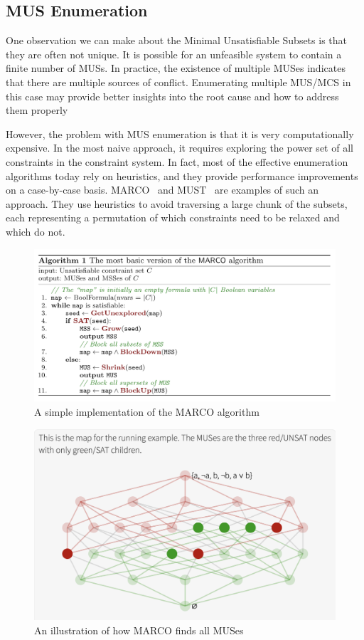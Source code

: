 \subsection{MUS Enumeration}
One observation we can make about the  Minimal Unsatisfiable Subsets is that they are often not unique. It is possible for an unfeasible system to contain a finite number of MUSs. In practice, the existence of multiple MUSes indicates that there are multiple sources of conflict. Enumerating multiple MUS/MCS in this case may provide better insights into the root cause and how to address them properly


However, the problem with MUS enumeration is that it is very computationally expensive. In the most naive approach, it requires exploring the power set of all constraints in the constraint system. In fact, most of the effective enumeration algorithms today rely on heuristics, and they provide performance improvements on a case-by-case basis. MARCO~\cite{Liffiton2016-xi} and MUST~\cite{Bendik2020-pz} are examples of such an approach. They use heuristics to avoid traversing a large chunk of the subsets, each representing a permutation of which constraints need to be relaxed and which do not.


\begin{figure}[hbt]
  \includegraphics[width=\linewidth]{MarcoAlgo}
  \caption{A simple implementation of the MARCO algorithm}
\end{figure}


\begin{figure}[hbt]
  \includegraphics[width=\linewidth]{MarcoViz}
  \caption{An illustration of how MARCO finds all MUSes}
\end{figure}
  

